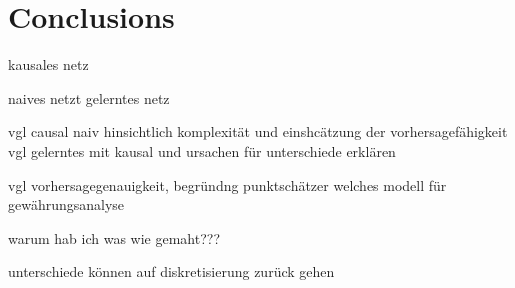 
\chapter{Conclusions} %

\label{Chapter4} %

kausales netz

naives netzt
gelerntes netz

vgl causal naiv hinsichtlich komplexität und einshcätzung der vorhersagefähigkeit
vgl gelerntes mit kausal und ursachen für unterschiede erklären

vgl vorhersagegenauigkeit, begründng punktschätzer
welches modell für gewährungsanalyse

warum hab ich was wie gemaht???

unterschiede können auf diskretisierung zurück gehen
